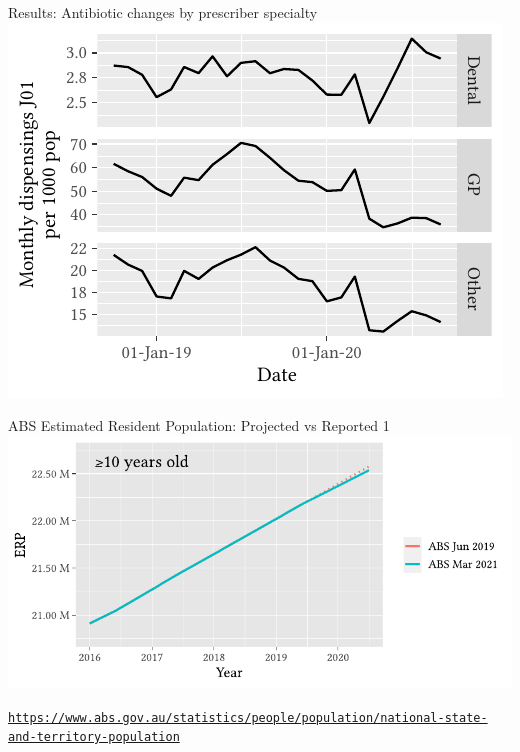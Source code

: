\documentclass[aspectratio=169,12pt]{beamer} %
\begin{document}
\begin{frame}{Results: Antibiotic changes by prescriber specialty}
\centering
\includegraphics{ref/latex-j01specialty-1.pdf}
\end{frame}

\begin{frame}{ABS Estimated Resident Population: Projected vs Reported 1}
	\center\includegraphics[height=0.75\textheight]{ref/pops-overall.pdf}
	\begin{flushright}\tiny\texttt{\url{https://www.abs.gov.au/statistics/people/population/national-state-and-territory-population}}\end{flushright}
\end{frame}
\end{document}
